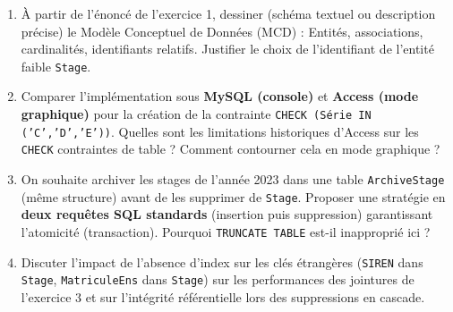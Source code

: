 \documentclass[11pt]{article}
\begin{document}
\begin{exercice}
\begin{enumerate}
    \item À partir de l'énoncé de l'exercice 1, dessiner (schéma textuel ou description précise) le Modèle Conceptuel de Données (MCD) : Entités, associations, cardinalités, identifiants relatifs. Justifier le choix de l'identifiant de l'entité faible \texttt{Stage}.
    \item Comparer l'implémentation sous \textbf{MySQL (console)} et \textbf{Access (mode graphique)} pour la création de la contrainte \texttt{CHECK (Série IN ('C','D','E'))}. Quelles sont les limitations historiques d'Access sur les \texttt{CHECK} contraintes de table ? Comment contourner cela en mode graphique ?
    \item On souhaite archiver les stages de l'année 2023 dans une table \texttt{ArchiveStage} (même structure) avant de les supprimer de \texttt{Stage}. Proposer une stratégie en \textbf{deux requêtes SQL standards} (insertion puis suppression) garantissant l'atomicité (transaction). Pourquoi \texttt{TRUNCATE TABLE} est-il inapproprié ici ?
    \item Discuter l'impact de l'absence d'index sur les clés étrangères (\texttt{SIREN} dans \texttt{Stage}, \texttt{MatriculeEns} dans \texttt{Stage}) sur les performances des jointures de l'exercice 3 et sur l'intégrité référentielle lors des suppressions en cascade.
\end{enumerate}
\end{exercice}
\end{document}
